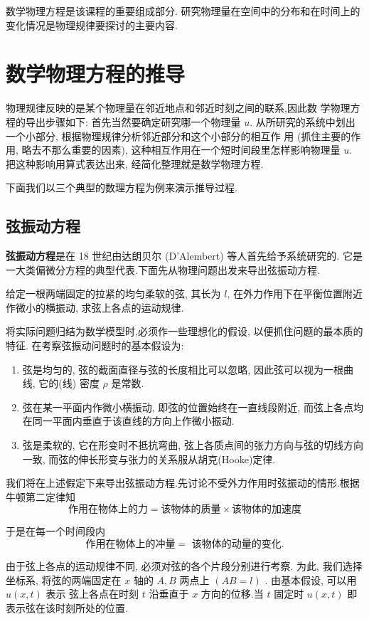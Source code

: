 数学物理方程是该课程的重要组成部分.
研究物理量在空间中的分布和在时间上的变化情况是物理规律要探讨的主要内容.
\section{数学物理方程的推导}
物理规律反映的是某个物理量在邻近地点和邻近时刻之间的联系,因此数
学物理方程的导出步骤如下: 首先当然要确定研究哪一个物理量 $u$. 从所研究的系统中划出一个小部分, 
根据物理规律分析邻近部分和这个小部分的相互作
用 (抓住主要的作用, 略去不那么重要的因素), 这种相互作用在一个短时间段里怎样影响物理量 $u$.
 把这种影响用算式表达出来, 经简化整理就是数学物理方程.

下面我们以三个典型的数理方程为例来演示推导过程.

\subsection{弦振动方程}
\textbf{弦振动方程}是在 18 世纪由达朗贝尔 (D'Alembert) 等人首先给予系统研究的.
它是一大类偏微分方程的典型代表.下面先从物理问题出发来导出弦振动方程.

给定一根两端固定的拉紧的均匀柔软的弦, 其长为 $l$, 在外力作用下在平衡位置附近作微小的横振动, 
求弦上各点的运动规律.

将实际问题归结为数学模型时,必须作一些理想化的假设, 以便抓住问题的最本质的特征.
在考察弦振动问题时的基本假设为:
\begin{enumerate}
    \item  弦是均匀的, 弦的截面直径与弦的长度相比可以忽略, 因此弦可以视为一根曲线, 
        它的(线) 密度 $\rho$ 是常数.
    \item 弦在某一平面内作微小横振动, 即弦的位置始终在一直线段附近, 
        而弦上各点均在同一平面内垂直于该直线的方向上作微小振动.
    \item  弦是柔软的, 它在形变时不抵抗弯曲, 弦上各质点间的张力方向与弦的切线方向一致,
        而弦的伸长形变与张力的关系服从胡克(Hooke)定律.
\end{enumerate}

我们将在上述假定下来导出弦振动方程.先讨论不受外力作用时弦振动的情形.根据牛顿第二定律知
$$
\text{作用在物体上的力} = \text{该物体的质量} \times \text{该物体的加速度}
$$

于是在每一个时间段内
$$
\text{作用在物体上的冲量} = \text{ 该物体的动量的变化}.
$$

由于弦上各点的运动规律不同, 必须对弦的各个片段分别进行考察.
为此, 我们选择坐标系, 将弦的两端固定在 $x$ 轴的 $A,B$ 两点上 $(AB=l)$ .
由基本假设, 可以用 $u(x, t)$ 表示
弦上各点在时刻 $t$ 沿垂直于 $x$ 方向的位移.当 $t$ 固定时 $u(x, t)$ 即表示弦在该时刻所处的位置.


